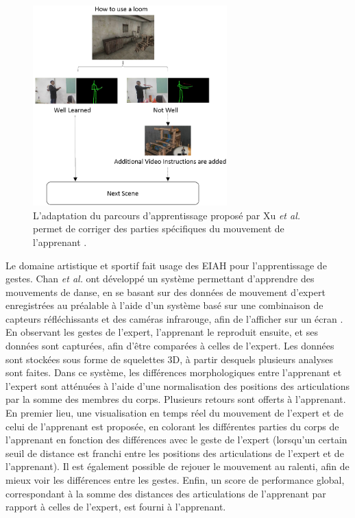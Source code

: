 \begin{figure}
    \centering
    \includegraphics[width=7.5cm]{pictures/eiah_xu.png}
    \caption[EIAH permettant de corriger des parties spécifiques du geste \parencite{Xu2019Ptt}]{L'adaptation du parcours d'apprentissage proposé par Xu \textit{et al.} permet de corriger des parties spécifiques du mouvement de l'apprenant \parencite{Xu2019Ptt}.}
    \label{fig:eiah_xu}
\end{figure}

Le domaine artistique et sportif fait usage des EIAH pour l'apprentissage de gestes. Chan \textit{et al.} ont développé un système permettant d'apprendre des mouvements de danse, en se basant sur des données de mouvement d'expert enregistrées au préalable à l'aide d'un système basé sur une combinaison de capteurs réfléchissants et des caméras infrarouge, afin de l'afficher sur un écran \parencite{Chan2011}. En observant les gestes de l'expert, l'apprenant le reproduit ensuite, et ses données sont capturées, afin d'être comparées à celles de l'expert. Les données sont stockées sous forme de squelettes 3D, à partir desquels plusieurs analyses sont faites. Dans ce système, les différences morphologiques entre l'apprenant et l'expert sont atténuées à l'aide d'une normalisation des positions des articulations par la somme des membres du corps. Plusieurs retours sont offerts à l'apprenant. En premier lieu, une visualisation en temps réel du mouvement de l'expert et de celui de l'apprenant est proposée, en colorant les différentes parties du corps de l'apprenant en fonction des différences avec le geste de l'expert (lorsqu'un certain seuil de distance est franchi entre les positions des articulations de l'expert et de l'apprenant). Il est également possible de rejouer le mouvement au ralenti, afin de mieux voir les différences entre les gestes. Enfin, un score de performance global, correspondant à la somme des distances des articulations de l'apprenant par rapport à celles de l'expert, est fourni à l'apprenant.

